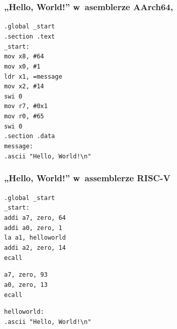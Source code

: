 \documentclass[10pt,t]{beamer}
\begin{document}
\begin{frame}
  \frametitle{„Hello, World!” w~asemblerze AArch64,
    \parencite{Low-Level-Learning-You-Can-Learn-AArch64-ETC-Ver-2020}}


  \texttt{.global \_start} \\
  \texttt{.section .text} \\



  \texttt{\_start:} \\[-0.2em]
  \hphantom{aaaaaaaa} \texttt{mov x8, \#64} \\
  \hphantom{aaaaaaaa} \texttt{mov x0, \#1} \\
  \hphantom{aaaaaaaa} \texttt{ldr x1, =message} \\
  \hphantom{aaaaaaaa} \texttt{mov x2, \#14} \\

  \hphantom{aaaaaaaa} \texttt{swi 0} \\

  \hphantom{aaaaaaaa} \texttt{mov r7, \#0x1} \\
  \hphantom{aaaaaaaa} \texttt{mov r0, \#65} \\

  \hphantom{aaaaaaaa} \texttt{swi 0} \\



  \texttt{.section .data} \\
  \texttt{message:} \\
  \hphantom{aaaaaaaa} \texttt{.ascii "Hello, World!\textbackslash n"}

\end{frame}





\begin{frame}
  \frametitle{„Hello, World!” w~assemblerze RISC-V
    \parencite{Anonymous-Hello-World-in-x86-Assembly-Language}}


  \texttt{.global \_start} \\
  \texttt{\_start:} \\
  \hphantom{aaaa} \texttt{addi a7, zero, 64} \\
  \hphantom{aaaa} \texttt{addi a0, zero, 1} \\
  \hphantom{aaaa} \texttt{la a1, helloworld} \\
  \hphantom{aaaa} \texttt{addi a2, zero, 14} \\
  \hphantom{aaaa} \texttt{ecall}
  \vspace{0.8em}

  \hphantom{aaaa} \texttt{a7, zero, 93} \\
  \hphantom{aaaa} \texttt{a0, zero, 13} \\
  \hphantom{aaaa} \texttt{ecall}
  \vspace{0.8em}

  \texttt{helloworld:} \\
  \hphantom{aaaa} \texttt{.ascii "Hello, World!\textbackslash n"}

\end{frame}
\end{document}
